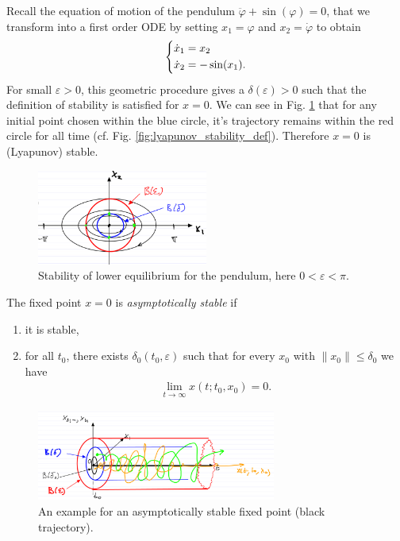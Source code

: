 \begin{ex}
	Recall the equation of motion of the pendulum $\ddot{\varphi} + \sin(\varphi) = 0$, that we transform into a first order ODE by setting $x_1 = \varphi$ and $x_2 = \dot{\varphi}$ to obtain
	\begin{align}
		\begin{dcases}
		\dot{x}_1 = x_2 \\
	\dot{x}_2 = -\sin(x_1).
		\end{dcases}
	\end{align}
	For small $\varepsilon>0$, this geometric procedure gives a $\delta(\varepsilon)>0$ such that the definition of stability is satisfied for $ {x}=0$. We can see in Fig. \ref{fig:pend_lower_stability} that for any initial point chosen within the blue circle, it's trajectory remains within the red circle for all time (cf. Fig. \ref{fig:lyapunov_stability_def}). Therefore $ {x}=0$ is (Lyapunov) stable.
	\begin{figure}[h!]
		\centering
		\includegraphics[width=0.5\textwidth]{figures/ch2/2pendulum_stability.png}
		\caption{Stability of lower equilibrium for the pendulum, here $0<\varepsilon<\pi $.}
	\label{fig:pend_lower_stability}
	\end{figure}
\end{ex}

\begin{definition}
	The fixed point $ {x}=0$ is \emph{asymptotically stable} if
\begin{enumerate}
	\item it is stable,
	\item for all $t_0$, there exists $\delta_0(t_0, \varepsilon)$ such that for every $ {x}_0$ with $\|  {x}_0 \| \leq \delta_0$ we have
		\begin{align}
			\boxed{\lim_{t\to \infty }  {x}(t; t_0,  {x}_0) = 0.}
		\end{align}
\end{enumerate}
\begin{figure}[h!]
	\centering
	\includegraphics[width=0.7\textwidth]{figures/ch2/3asymp_stability.png}
	\caption{An example for an asymptotically stable fixed point (black trajectory).}
\end{figure}
\end{definition}

